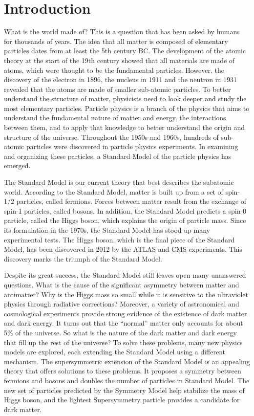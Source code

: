 \documentclass[12pt,oneside]{memoir}
\begin{document}

\chapter{Introduction}
What is the world made of? This is a question that has been asked by humans for thousands of years. 
The idea that all matter is composed of elementary particles dates from at least the 5th century BC. 
The development of the atomic theory at the start of the 19th century showed that all materials are 
made of atoms, which were thought to be the fundamental particles. However, the discovery of the electron 
in 1896, the nucleus in 1911 and the neutron in 1931 revealed that the atoms are made of smaller sub-atomic particles. 
To better understand the structure of matter, physicists need to look deeper and study the most elementary particles. 
Particle physics is a branch of the physics that aims to understand the fundamental nature of matter and energy, 
the interactions between them, and to apply that knowledge to better understand the origin and structure of the universe. 
Throughout the 1950s and 1960s, hundreds of sub-atomic particles were discovered in particle physics experiments.
In examining and organizing these particles, a Standard Model of the particle physics has emerged.

The Standard Model is our current theory that best describes the subatomic world. 
According to the Standard Model, matter is built up from a set of spin-1/2 particles, called fermions. 
Forces between matter result from the exchange of spin-1 particles, called bosons. 
In addition, the Standard Model predicts a spin-0 particle, called the Higgs boson, which explains the origin of particle mass. 
Since its formulation in the 1970s, the Standard Model has stood up many experimental tests. 
The Higgs boson, which is the final piece of the Standard Model, has been discovered in 2012 by the ATLAS and CMS experiments. 
This discovery marks the triumph of the Standard Model. 

Despite its great success, the Standard Model still leaves open many unanswered questions. 
What is the cause of the significant asymmetry between matter and antimatter? 
Why is the Higgs mass so small while it is sensitive to the ultraviolet physics through radiative corrections?
Moreover, a variety of astronomical and cosmological experiments provide strong evidence of the existence of dark matter and dark energy. 
It turns out that the ``normal'' matter only accounts for about 5\% of the universe. 
So what is the nature of the dark matter and dark energy that fill up the rest of the universe? 
To solve these problems, many new physics models are explored, each extending the Standard Model using a different mechanism. 
The supersymmetric extension of the Standard Model is an appealing theory that offers solutions to these problems.
It proposes a symmetry between fermions and bosons and doubles the number of particles in Standard Model. 
The new set of particles predicted by the Symmetry Model help stabilize the mass of Higgs boson, and the lightest Supersymmetry particle provides a candidate for dark matter. 
\end{document}
